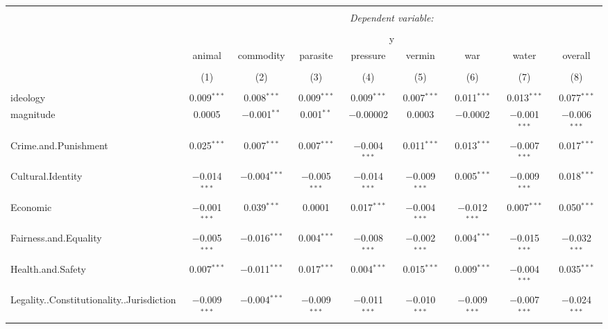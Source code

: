 
\begin{table}[!htbp] \centering 
  \caption{} 
  \label{} 
\begin{tabular}{@{\extracolsep{5pt}}lcccccccc} 
\\[-1.8ex]\hline 
\hline \\[-1.8ex] 
 & \multicolumn{8}{c}{\textit{Dependent variable:}} \\ 
\cline{2-9} 
\\[-1.8ex] & \multicolumn{8}{c}{y} \\ 
 & animal & commodity & parasite & pressure & vermin & war & water & overall \\ 
\\[-1.8ex] & (1) & (2) & (3) & (4) & (5) & (6) & (7) & (8)\\ 
\hline \\[-1.8ex] 
 ideology & 0.009$^{***}$ & 0.008$^{***}$ & 0.009$^{***}$ & 0.009$^{***}$ & 0.007$^{***}$ & 0.011$^{***}$ & 0.013$^{***}$ & 0.077$^{***}$ \\ 
  magnitude & 0.0005 & $-$0.001$^{**}$ & 0.001$^{**}$ & $-$0.00002 & 0.0003 & $-$0.0002 & $-$0.001$^{***}$ & $-$0.006$^{***}$ \\ 
  Crime.and.Punishment & 0.025$^{***}$ & 0.007$^{***}$ & 0.007$^{***}$ & $-$0.004$^{***}$ & 0.011$^{***}$ & 0.013$^{***}$ & $-$0.007$^{***}$ & 0.017$^{***}$ \\ 
  Cultural.Identity & $-$0.014$^{***}$ & $-$0.004$^{***}$ & $-$0.005$^{***}$ & $-$0.014$^{***}$ & $-$0.009$^{***}$ & 0.005$^{***}$ & $-$0.009$^{***}$ & 0.018$^{***}$ \\ 
  Economic & $-$0.001$^{***}$ & 0.039$^{***}$ & 0.0001 & 0.017$^{***}$ & $-$0.004$^{***}$ & $-$0.012$^{***}$ & 0.007$^{***}$ & 0.050$^{***}$ \\ 
  Fairness.and.Equality & $-$0.005$^{***}$ & $-$0.016$^{***}$ & 0.004$^{***}$ & $-$0.008$^{***}$ & $-$0.002$^{***}$ & 0.004$^{***}$ & $-$0.015$^{***}$ & $-$0.032$^{***}$ \\ 
  Health.and.Safety & 0.007$^{***}$ & $-$0.011$^{***}$ & 0.017$^{***}$ & 0.004$^{***}$ & 0.015$^{***}$ & 0.009$^{***}$ & $-$0.004$^{***}$ & 0.035$^{***}$ \\ 
  Legality..Constitutionality..Jurisdiction & $-$0.009$^{***}$ & $-$0.004$^{***}$ & $-$0.009$^{***}$ & $-$0.011$^{***}$ & $-$0.010$^{***}$ & $-$0.009$^{***}$ & $-$0.007$^{***}$ & $-$0.024$^{***}$ \\ 

\end{tabular}
\end{table}
